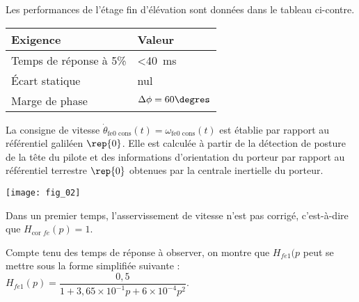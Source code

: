 Les performances de l’étage fin d’élévation sont données dans le tableau ci-contre. 
\begin{margintable}
\begin{tabular}{p{3cm}l}
\hline
\textbf{Exigence} & Valeur \\ \hline
Temps de réponse à 5\% & <\SI{40}{ms} \\ 
Écart statique & nul \\ 
Marge de phase & $\Delta \phi = 60\degres$ \\ \hline
\end{tabular}
\end{margintable}

La consigne de vitesse $\dot{\theta}_{\text{fe0 cons}}(t)= \omega_{\text{fe0 cons}}(t)$ est établie par rapport au référentiel galiléen $\rep{0}$. Elle est calculée à partir de la détection de posture  de la tête du pilote et des informations 
d’orientation du porteur par rapport au référentiel terrestre $\rep{0}$ obtenues par la centrale inertielle du porteur.


\begin{center}
\texttt{[image: fig\_02]}

\end{center}

Dans un premier temps, l’asservissement de vitesse n’est pas corrigé, c’est-à-dire que $H_{\text{cor }fe}(p)=1$.



\ifprof
\begin{corrige}
\end{corrige}
\else
\fi
Compte tenu des temps de réponse à observer, on montre que $H_{fe1}(p$ peut se mettre sous la forme simplifiée suivante : $H_{fe1}(p)=\dfrac{0,5}{1+3,65\times 10^{-1}p+6\times 10^{-4}p^2}$.
\ifprof
\begin{corrige}
\end{corrige}
\else
\fi


